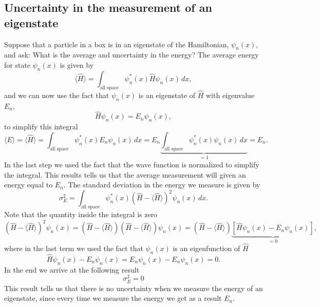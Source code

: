 \documentclass[../Main/chem331-notes.tex]{subfiles}
\begin{document}
\subsection{Uncertainty in the measurement of an eigenstate}
Suppose that a particle in a box is in an eigenstate of the Hamiltonian, $\psi_n(x)$, and ask: What is the average and uncertainty in the energy?
The average energy for state $\psi_n(x)$ is given by
\begin{equation}
\langle \hat{H} \rangle =  \int_\text{all space} \psi_n^*(x) \hat{H} \psi_n(x) \, dx,
\end{equation}
and we can now use the fact that $\psi_n(x)$ is an eigenstate of $\hat{H}$ with eigenvalue $E_n$,
\begin{equation}
\hat{H} \psi_n(x) = E_n \psi_n(x),
\end{equation}
to simplify this integral
\begin{equation}
\langle E \rangle = \langle \hat{H} \rangle =  \int_\text{all space} \psi_n^*(x) E_n \psi_n(x) \, dx 
=  E_n \underbrace{\int_\text{all space} \psi_n^*(x) \psi_n(x) \, dx}_{= 1} = E_n.
\end{equation}
In the last step we used the fact that the wave function is normalized to simplify the integral.
This results tells us that the average measurement will given an energy equal to $E_n$.
The standard deviation in the energy we measure is given by
\begin{equation}
\sigma^2_E
= \int_\text{all space} \psi_n^*(x) (\hat{H} - \langle \hat{H} \rangle)^2 \psi_n(x) \, dx.
\end{equation}
Note that the quantity inside the integral is zero
\begin{equation}
(\hat{H} - \langle \hat{H} \rangle)^2 \psi_n(x) = (\hat{H} - \langle \hat{H} \rangle) (\hat{H} - \langle \hat{H} \rangle)\psi_n(x) = (\hat{H} - \langle \hat{H} \rangle) \underbrace{\left[\hat{H} \psi_n(x) - E_n \psi_n(x)\right]}_{= 0},
\end{equation}
where in the last term we used the fact that $\psi_n(x)$ is an eigenfunction of $\hat{H}$
\begin{equation}
\hat{H} \psi_n(x) - E_n \psi_n(x) = E_n \psi_n(x) - E_n \psi_n(x) = 0.
\end{equation}
In the end we arrive at the following result
\begin{equation}
\sigma^2_E = 0
\end{equation}
This result tells us that there is no uncertainty when we measure the energy of an eigenstate, since every time we measure the energy we get as a result $E_n$.
\end{document}
